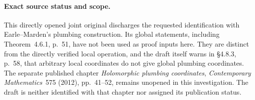 \paragraph{Exact source status and scope.}
This directly opened joint original discharges the requested
identification with Earle--Marden's plumbing construction.
Its global statements, including Theorem~4.6.1, p.~51, have not been
used as proof inputs here. They are distinct from the directly verified
local operation, and the draft itself warns in \S4.8.3, p.~58, that
arbitrary local coordinates do not give global plumbing coordinates.
The separate published chapter \emph{Holomorphic plumbing coordinates},
\emph{Contemporary Mathematics}~575 (2012), pp.~41--52, remains
unopened in this investigation. The draft is neither identified with
that chapter nor assigned its publication status.
